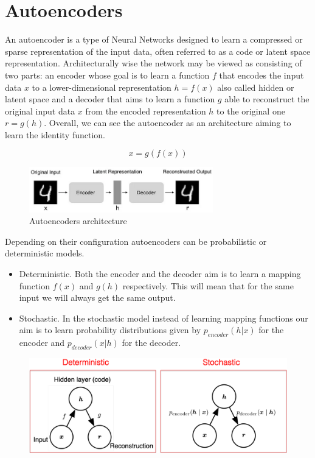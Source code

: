 \chapter{Autoencoders}

An autoencoder is a type of Neural Networks designed to learn a compressed or sparse representation of the input data, often referred to as a code or latent space representation. Architecturally wise the network may be viewed as consisting of two parts: an encoder whose goal is to learn a function $f$ that encodes the input data $x$ to a lower-dimensional representation $h=f(x)$ also called hidden or latent space and a decoder that aims to learn a function $g$ able to reconstruct the original input data $x$ from the encoded representation $h$ to the original one $r=g(h)$. Overall, we can see the autoencoder as an architecture aiming to learn the identity function.

$$ x = g(f(x)) $$

\begin{figure}[h]
    \centering
    \includegraphics[width=8cm]{Images/autoencoder-architecture.png}
    \caption{Autoencoders architecture}
\end{figure}

\noindent Depending on their configuration autoencoders can be probabilistic or deterministic models.

\begin{itemize}
    \item Deterministic. Both the encoder and the decoder aim is to learn a mapping function $f(x)$ and $g(h)$ respectively. This will mean that for the same input we will always get the same output.
    \item Stochastic. In the stochastic model instead of learning mapping functions our aim is to learn probability distributions given by $p_{encoder} (h | x)$ for the encoder and $p_{decoder} (x | h)$ for the decoder.
\end{itemize}

\begin{figure}[h]
    \centering
    \includegraphics[width=12cm]{Images/autoencoder-det-sto.png}
\end{figure}

